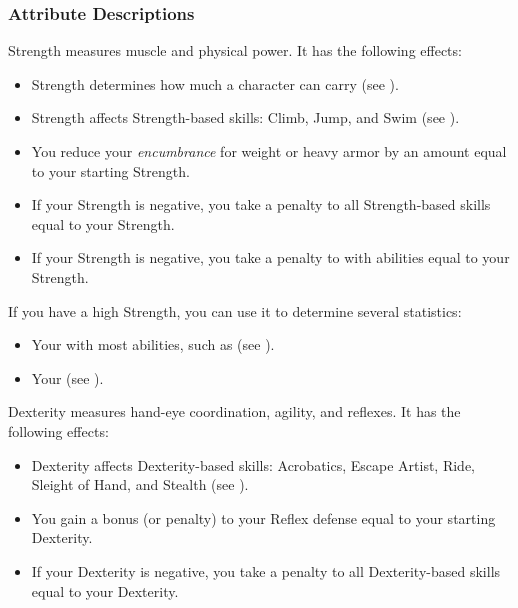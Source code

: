         \subsubsection{Attribute Descriptions}

            \label{Strength}
                Strength measures muscle and physical power.
                It has the following effects:
                \begin{itemize}
                    \item Strength determines how much a character can carry (see ).
                    \item Strength affects Strength-based skills: Climb, Jump, and Swim (see ).
                    \item You reduce your \textit{encumbrance} for weight or heavy armor by an amount equal to your starting Strength.
                    \item If your Strength is negative, you take a penalty to all Strength-based skills equal to your Strength.
                    \item If your Strength is negative, you take a penalty to  with  abilities equal to your Strength.
                \end{itemize}

                If you have a high Strength, you can use it to determine several statistics:
                \begin{itemize}
                    \item Your  with most  abilities, such as  (see ).
                    \item Your  (see ).
                \end{itemize}

            \label{Dexterity}
                Dexterity measures hand-eye coordination, agility, and reflexes.
                It has the following effects:
                \begin{itemize}
                    \item Dexterity affects Dexterity-based skills: Acrobatics, Escape Artist, Ride, Sleight of Hand, and Stealth (see ).
                    \item You gain a bonus (or penalty) to your Reflex defense equal to your starting Dexterity.
                    \item If your Dexterity is negative, you take a penalty to all Dexterity-based skills equal to your Dexterity.
                \end{itemize}

